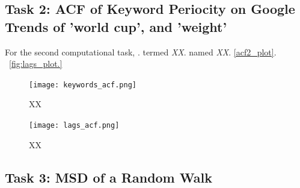 \documentclass{article}
\begin{document}
\subsection{Task 2: ACF of Keyword Periocity on Google Trends of 'world cup', and 'weight'}

For the second computational task, . termed {\it XX}. named {\it XX}. \~\ref{acf2_plot}. ~\ref{fig:lags_plot.}

\begin{figure}[H]
\centering
\texttt{[image: keywords\_acf.png]}
\caption{XX}
\label{fig:acf2_plot}
\end{figure}

\begin{figure}[H]
\centering
\texttt{[image: lags\_acf.png]}
\caption{XX}
\label{fig:lags_plot}
\end{figure}

\subsection{Task 3: MSD of a Random Walk}
\end{document}
